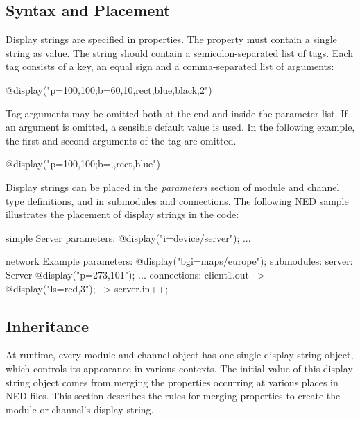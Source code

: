 \subsection{Syntax and Placement}

Display strings are specified in  properties. The property
must contain a single string as value. The string should contain a
semicolon-separated list of tags. Each tag consists of a key, an equal sign
and a comma-separated list of arguments:

\begin{ned}
@display("p=100,100;b=60,10,rect,blue,black,2")
\end{ned}

Tag arguments may be omitted both at the end and inside the parameter list.
If an argument is omitted, a sensible default value is used. In the following
example, the first and second arguments of the  tag are omitted.

\begin{ned}
@display("p=100,100;b=,,rect,blue")
\end{ned}

Display strings can be placed in the \textit{parameters} section of module
and channel type definitions, and in submodules and connections. The
following NED sample illustrates the placement of display strings in the
code:

\begin{ned}
simple Server
{
    parameters:
        @display("i=device/server");
    ...
}

network Example
{
    parameters:
        @display("bgi=maps/europe");
    submodules:
        server: Server {
            @display("p=273,101");
        }
        ...
    connections:
        client1.out --> { @display("ls=red,3"); } --> server.in++;
}
\end{ned}


\subsection{Inheritance}

At runtime, every module and channel object has one single display string object,
which controls its appearance in various contexts. The initial value of
this display string object comes from merging the 
properties occurring at various places in NED files.
This section describes the rules for merging  properties
to create the module or channel's display string.


